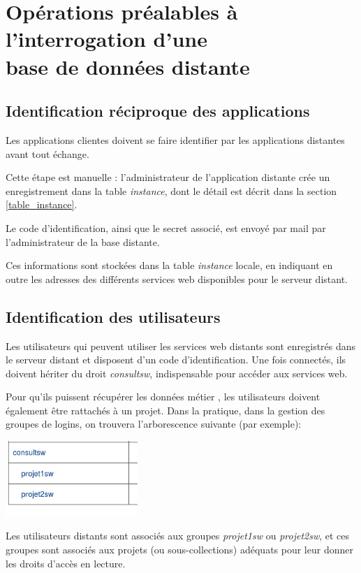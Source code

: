 \section{Opérations préalables à l'interrogation d'une \\base de données distante}
\subsection{Identification réciproque des applications}

Les applications clientes doivent se faire identifier par les applications distantes avant tout échange.

Cette étape est manuelle : l'administrateur de l'application distante crée un enregistrement dans la table \textit{instance}, dont le détail est décrit dans la section \ref{table_instance}.

Le code d'identification, ainsi que le secret associé, est envoyé par mail par l'administrateur de la base distante.

Ces informations sont stockées dans la table \textit{instance} locale, en indiquant en outre les adresses des différents services web disponibles pour le serveur distant.

\subsection{Identification des utilisateurs}
Les utilisateurs qui peuvent utiliser les services web distants sont enregistrés dans le serveur distant et disposent d'un code d'identification. Une fois connectés, ils doivent hériter du droit \textit{consultsw}, indispensable pour accéder aux services web.

Pour qu'ils puissent récupérer les données \og métier \fg{}, les utilisateurs doivent également être rattachés à un projet. Dans la pratique, dans la gestion des groupes de logins, on trouvera l'arborescence suivante (par exemple):
\begin{center}

\includegraphics[width=5cm]{images/arborescence_groupes_sw}

\end{center}

Les utilisateurs distants sont associés aux groupes \textit{projet1sw} ou \textit{projet2sw}, et ces groupes sont associés aux projets (ou sous-collections) adéquats pour leur donner les droits d'accès en lecture.